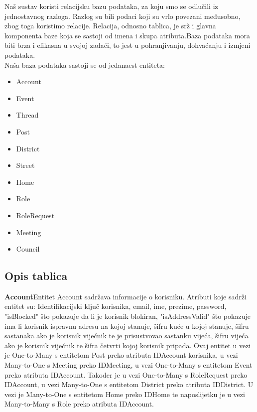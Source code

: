 		
Naš sustav koristi relacijsku bazu podataka, za koju smo se odlučili iz jednostavnog razloga. Razlog su bili podaci koji su vrlo povezani međusobno, zbog toga koristimo relacije. Relacija, odnosno tablica, je srž i glavna komponenta baze koja se sastoji od imena i skupa atributa.Baza podataka mora biti brza i efikasna u svojoj zadaći, to jest u pohranjivanju, dohvaćanju i izmjeni podataka.\\
Naša baza podataka sastoji se od jedanaest entiteta:
\begin{multicols}{3}

\begin{itemize}
\item Account
\item Event
\item Thread
\item Post

\end{itemize}

\columnbreak

\begin{itemize}
\item District
\item Street
\item Home
\item Role

\end{itemize}

\begin{itemize}
\item RoleRequest
\item Meeting
\item Council
\end{itemize}
\end{multicols}
		
			\subsection{Opis tablica}
			
				
	\textbf{\large Account}\quad\quad Entitet Account sadržava informacije o korisniku.
				Atributi koje sadrži entitet su: Identifikacijski ključ korisnika, email, ime, prezime, password, "isBlocked" što pokazuje da li je korisnik blokiran, "isAddressValid" što pokazuje ima li korisnik ispravnu adresu na kojoj stanuje, šifru kuće u kojoj stanuje, šifru sastanaka ako je korisnik vijećnik te je prisustvovao sastanku vijeća, šifru vijeća ako je korisnik vijećnik te šifra četvrti kojoj korisnik pripada. Ovaj entitet u vezi je One-to-Many s entitetom Post preko atributa IDAccount korisnika, u vezi Many-to-One s Meeting preko IDMeeting, u vezi One-to-Many s entitetom Event preko atributa IDAccount. Također je u vezi One-to-Many s RoleRequest preko IDAccount, u vezi Many-to-One s entitetom District preko atributa IDDistrict. U vezi je Many-to-One s entitetom Home preko IDHome te naposlijetku je u vezi Many-to-Many s Role preko atributa IDAccount.
				
